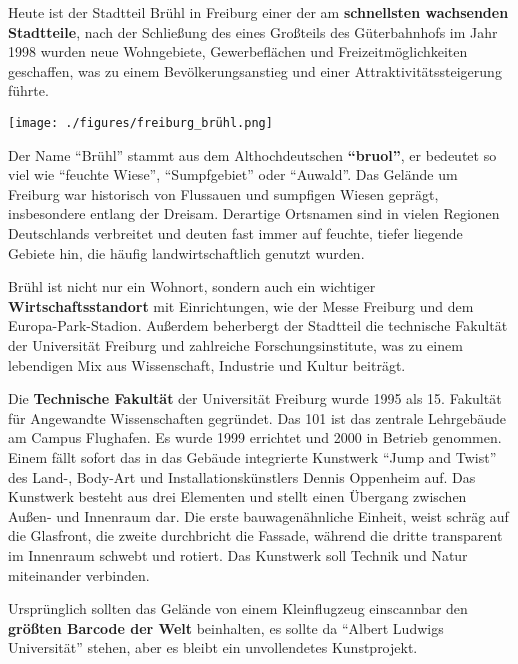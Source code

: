 \documentclass[landscape, a4paper]{article}
\newcommand\alert[1]{\textcolor{PrimaryColor}{\textbf{#1}}}
\begin{document}
\newpage
\begin{minipage}[t]{0.32\textwidth}
	\vspace{0cm}
	\setlength{\parskip}{0.25cm}

	Heute ist der Stadtteil Brühl in Freiburg einer der am \alert{schnellsten wachsenden Stadtteile}, nach der Schließung des eines Großteils des Güterbahnhofs im Jahr 1998 wurden neue Wohngebiete, Gewerbeflächen und Freizeitmöglichkeiten geschaffen, was zu einem Bevölkerungsanstieg und einer Attraktivitätssteigerung führte.

	\texttt{[image: ./figures/freiburg\_brühl.png]}
	\setlength{\parskip}{0.25cm}

	Der Name \enquote{Brühl} stammt aus dem Althochdeutschen \alert{\enquote{bruol}}, er bedeutet so viel wie \enquote{feuchte Wiese}, \enquote{Sumpfgebiet} oder \enquote{Auwald}. Das Gelände um Freiburg war historisch von Flussauen und sumpfigen Wiesen geprägt, insbesondere entlang der Dreisam. Derartige Ortsnamen sind in vielen Regionen Deutschlands verbreitet und deuten fast immer auf feuchte, tiefer liegende Gebiete hin, die häufig landwirtschaftlich genutzt wurden.

	Brühl ist nicht nur ein Wohnort, sondern auch ein wichtiger \alert{Wirtschaftsstandort} mit Einrichtungen, wie der Messe Freiburg und dem Europa-Park-Stadion. Außerdem beherbergt der Stadtteil die technische Fakultät der Universität Freiburg und zahlreiche Forschungsinstitute, was zu einem lebendigen Mix aus Wissenschaft, Industrie und Kultur beiträgt.

  Die \alert{Technische Fakultät} der Universität Freiburg wurde 1995 als 15. Fakultät für Angewandte Wissenschaften gegründet. Das 101 ist das zentrale Lehrgebäude am Campus Flughafen. Es wurde 1999 errichtet und 2000 in Betrieb genommen. Einem fällt sofort das in das Gebäude integrierte Kunstwerk \enquote{Jump and Twist} des Land-, Body-Art und Installationskünstlers Dennis Oppenheim auf. Das Kunstwerk besteht aus drei Elementen und stellt einen Übergang zwischen Außen- und Innenraum dar. Die erste bauwagenähnliche Einheit, weist schräg auf die Glasfront, die zweite durchbricht die Fassade, während die dritte transparent im Innenraum schwebt und rotiert. Das Kunstwerk soll Technik und Natur miteinander verbinden.

  Ursprünglich sollten das Gelände von einem Kleinflugzeug einscannbar den \alert{größten Barcode der Welt} beinhalten, es sollte da \enquote{Albert Ludwigs Universität} stehen, aber es bleibt ein unvollendetes Kunstprojekt.
\end{minipage}
\end{document}
